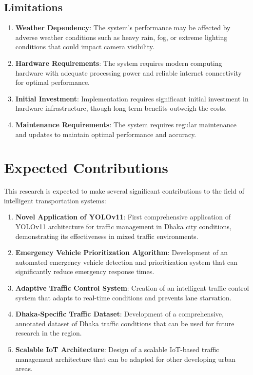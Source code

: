 \subsection{Limitations}

\begin{enumerate}
    \item \textbf{Weather Dependency}: The system's performance may be affected by adverse weather conditions such as heavy rain, fog, or extreme lighting conditions that could impact camera visibility.
    
    \item \textbf{Hardware Requirements}: The system requires modern computing hardware with adequate processing power and reliable internet connectivity for optimal performance.
    
    \item \textbf{Initial Investment}: Implementation requires significant initial investment in hardware infrastructure, though long-term benefits outweigh the costs.
    
    \item \textbf{Maintenance Requirements}: The system requires regular maintenance and updates to maintain optimal performance and accuracy.
\end{enumerate}



\section{Expected Contributions}

This research is expected to make several significant contributions to the field of intelligent transportation systems:

\begin{enumerate}
    \item \textbf{Novel Application of YOLOv11}: First comprehensive application of YOLOv11 architecture for traffic management in Dhaka city conditions, demonstrating its effectiveness in mixed traffic environments.
    
    \item \textbf{Emergency Vehicle Prioritization Algorithm}: Development of an automated emergency vehicle detection and prioritization system that can significantly reduce emergency response times.
    
    \item \textbf{Adaptive Traffic Control System}: Creation of an intelligent traffic control system that adapts to real-time conditions and prevents lane starvation.
    
    \item \textbf{Dhaka-Specific Traffic Dataset}: Development of a comprehensive, annotated dataset of Dhaka traffic conditions that can be used for future research in the region.
    
    \item \textbf{Scalable IoT Architecture}: Design of a scalable IoT-based traffic management architecture that can be adapted for other developing urban areas.
\end{enumerate}

